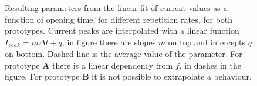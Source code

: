 \begin{figure}
 \centering
 \hfill
 \caption{Resulting parameters from the linear fit of current values as a function of opening time, for different repetition rates, for both prototypes. Current peaks are interpolated with a linear function $I_{peak} = m \Delta t + q$, in figure there are slopes $m$ on top and intercepts $q$ on bottom. Dashed line is the average value of the parameter. For prototype \textbf{A} there is a linear dependency from $f$, in dashes in the figure. For prototype \textbf{B} it is not possible to extrapolate a behaviour.}
 \label{fig:lingas_I}
\end{figure}

